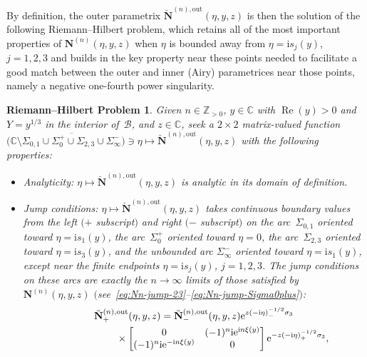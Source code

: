 \documentclass[11pt]{article}
\numberwithin{equation}{section}
\numberwithin{equation}{section}
\newtheorem{rhp}[Theorem]{Riemann--Hilbert Problem}
 { \theoremstyle{definition}
\newtheorem{Definition}[Theorem]{Definition}
\newtheorem{Note}[Theorem]{Note}
\newtheorem{Example}[Theorem]{Example}
\newtheorem{Remark}[Theorem]{Remark} }
\begin{document}
By definition, the outer parametrix $\breve{\mathbf{N}}^{(n),\mathrm{out}}(\eta,y,z)$ is then the solution of the following Riemann--Hilbert problem, which retains all of the most important properties of $\mathbf{N}^{(n)}(\eta,y,z)$ when $\eta$ is bounded away from $\eta=\mathrm{i} s_j(y)$, $j=1,2,3$ and builds in the key property near these points needed to facilitate a good match between the outer and inner (Airy) parametrices near those points, namely a negative one-fourth power singularity.
\begin{rhp}\label{rhp:genus1outer}
Given $n\in\mathbb{Z}_{>0}$, $y\in\mathbb{C}$ with $\operatorname{Re}(y)>0$ and $Y=y^{1/3}$ in the interior of~$\mathcal{B}$, and $z\in\mathbb{C}$, seek a $2\times 2$ matrix-valued function $\bigl(\mathbb{C}\setminus \overline{\Sigma_{0,1}\cup\Sigma_0^+\cup\Sigma_{2,3}\cup\Sigma_\infty^-}\bigr)\ni\eta\mapsto\breve{\mathbf{N}}^{(n),\mathrm{out}}(\eta,y,z)$ with the following properties:
\begin{itemize}\itemsep=0pt
\item[] Analyticity: $\eta\mapsto\breve{\mathbf{N}}^{(n),\mathrm{out}}(\eta,y,z)$ is analytic in its domain of definition.
\item[]Jump conditions: $\eta\mapsto\breve{\mathbf{N}}^{(n),\mathrm{out}}(\eta,y,z)$ takes continuous boundary values from the left $(+$ subscript$)$ and right $(-$ subscript$)$ on the arc~$\Sigma_{0,1}$ oriented toward $\eta=\mathrm{i} s_1(y)$, the arc~$\Sigma_0^+$ oriented toward $\eta=0$, the arc~$\Sigma_{2,3}$ oriented toward $\eta=\mathrm{i} s_3(y)$, and the unbounded arc $\Sigma_{\infty}^-$ oriented toward $\eta=\mathrm{i} s_1(y)$, except near the finite endpoints $\eta=\mathrm{i} s_j(y)$, $j=1,2,3$. The jump conditions on these arcs are exactly the $n\to\infty$ limits of those satisfied by~$\mathbf{N}^{(n)}(\eta,y,z)$ $($see~\eqref{eq:Nn-jump-23}--\eqref{eq:Nn-jump-Sigma0plus}$)$:
\begin{gather}
 \breve{\mathbf{N}}^{(n),\mathrm{out}}_+(\eta,y,z)
=\breve{\mathbf{N}}^{(n),\mathrm{out}}_-(\eta,y,z)\mathrm{e}^{z(-\mathrm{i}\eta)^{-1/2}_-\sigma_3}\nonumber \\
\hphantom{\breve{\mathbf{N}}^{(n),\mathrm{out}}_+(\eta,y,z)=}{}\times \begin{bmatrix}0 & (-1)^n\mathrm{i}\mathrm{e}^{\mathrm{i} n\xi(y)} \nonumber \\
(-1)^n\mathrm{i}\mathrm{e}^{-\mathrm{i} n\xi(y)} & 0\end{bmatrix}\mathrm{e}^{-z(-\mathrm{i}\eta)^{-1/2}_+\sigma_3}, \qquad

\end{gather}
\end{itemize}
\end{rhp}
\end{document}
